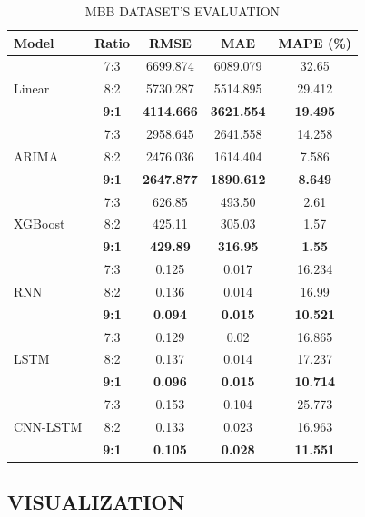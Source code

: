 \documentclass[conference]{IEEEtran}
\begin{document}
\begin{table}[h]
\centering
\caption{MBB DATASET’S EVALUATION}
\begin{tabular}{lcccc}
\toprule
\textbf{Model} & \textbf{Ratio} & \textbf{RMSE} & \textbf{MAE} & \textbf{MAPE (\%)} \\ \midrule
\multirow{3}{*}{Linear} & 7:3 & 6699.874 & 6089.079 & 32.65 \\
                        & 8:2 & 5730.287 & 5514.895 & 29.412 \\
                        & \textbf{9:1} & \textbf{4114.666} & \textbf{3621.554} & \textbf{19.495} \\ \midrule
\multirow{3}{*}{ARIMA} & 7:3 & 2958.645 & 2641.558 & 14.258 \\
                        & 8:2 & 2476.036 & 1614.404 & 7.586 \\
                        & \textbf{9:1} & \textbf{2647.877} & \textbf{1890.612} & \textbf{8.649} \\ \midrule
\multirow{3}{*}{XGBoost} & 7:3 & 626.85 & 493.50 & 2.61 \\
                        & 8:2 & 425.11 & 305.03 & 1.57 \\
                        & \textbf{9:1} & \textbf{429.89} & \textbf{316.95} & \textbf{1.55} \\ \midrule
\multirow{3}{*}{RNN} & 7:3 & 0.125 & 0.017 & 16.234 \\
                        & 8:2 & 0.136 & 0.014 & 16.99 \\
                        & \textbf{9:1} & \textbf{0.094} & \textbf{0.015} & \textbf{10.521} \\ \midrule
\multirow{3}{*}{LSTM} & 7:3 & 0.129 & 0.02 & 16.865 \\
                        & 8:2 & 0.137 & 0.014 & 17.237 \\
                        & \textbf{9:1} & \textbf{0.096} & \textbf{0.015} & \textbf{10.714} \\ \midrule
\multirow{3}{*}{CNN-LSTM} & 7:3 & 0.153 & 0.104 & 25.773 \\
                        & 8:2 & 0.133 & 0.023 & 16.963 \\
                        & \textbf{9:1} & \textbf{0.105} & \textbf{0.028} & \textbf{11.551} \\ \bottomrule
\end{tabular}
\end{table}

\subsection{VISUALIZATION}
\end{document}
